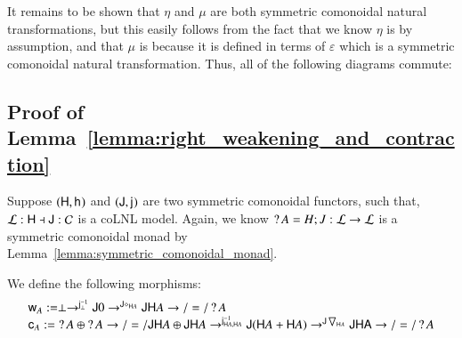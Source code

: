 It remains to be shown that $\eta$ and $\mu$ are both
symmetric comonoidal natural transformations, but this easily follows
from the fact that we know $\eta$ is by assumption, and that $\mu$
is because it is defined in terms of $\varepsilon$ which is a
symmetric comonoidal natural transformation.  Thus, all of the
following diagrams commute:

\subsection{Proof of Lemma~\ref{lemma:right_weakening_and_contraction}}
\label{subsec:proof_of_lemma:right_weakening_and_contraction}
Suppose $(\mathsf{H},\mathsf{h}_{})$ and $(\mathsf{J},\mathsf{j}_{})$ are two symmetric
  comonoidal functors, such that, $\mathcal{L} : \mathsf{H} \dashv \mathsf{J}
  : \mathcal{C}$ is a coLNL model.  Again, we know $\mathop{?} A = H;J : \mathcal{L}
  \rightarrow \mathcal{L}$ is a symmetric comonoidal monad by
  Lemma~\ref{lemma:symmetric_comonoidal_monad}.  
  
  We define the following morphisms:
  \[
  \begin{array}{lll}
    \mathsf{w}_{A} := \perp \rightarrow^{\mathsf{j}^{-1}_{\perp}} \mathsf{J} 0 \rightarrow^{\mathsf{J}\diamond_{\mathsf{H} A}} \mathsf{JH}A \rightarrow/=/ \mathop{?} A\\
    \mathsf{c}_{A} := \mathop{?} A \oplus \mathop{?} A \rightarrow/=/ \mathsf{JH}A \oplus \mathsf{JH}A \rightarrow^{\mathsf{j}^{-1}_{\mathsf{H}A,\mathsf{H}A}} \mathsf{J}(\mathsf{H}A + \mathsf{H}A) \rightarrow^{\mathsf{J}\bigtriangledown_{\mathsf{H}A}} \mathsf{JHA} \rightarrow/=/ \mathop{?} A
  \end{array}
  \]
  
